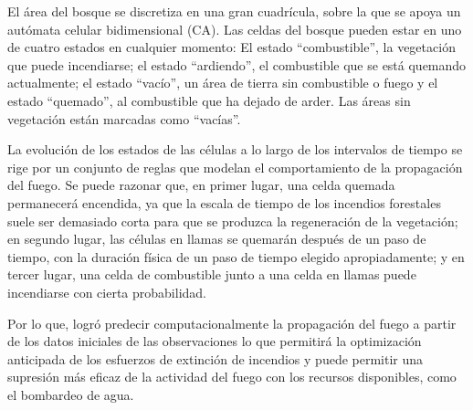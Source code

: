 \documentclass[10pt,conference]{IEEEtran}
\begin{document}
El área del bosque se discretiza en una gran cuadrícula, sobre la que se apoya un autómata celular bidimensional (CA). Las celdas del bosque pueden estar en uno de cuatro estados en cualquier momento: El estado ``combustible'', la vegetación que puede incendiarse; el estado ``ardiendo'', el combustible que se está quemando actualmente; el estado ``vacío'', un área de tierra sin combustible o fuego y el estado ``quemado'', al combustible que ha dejado de arder. Las áreas sin vegetación están marcadas como ``vacías''.\par La evolución de los estados de las células a lo largo de los intervalos de tiempo se rige por un conjunto de reglas que modelan el comportamiento de la propagación del fuego. Se puede razonar que, en primer lugar, una celda quemada permanecerá encendida, ya que la escala de tiempo de los incendios forestales suele ser demasiado corta para que se produzca la regeneración de la vegetación; en segundo lugar, las células en llamas se quemarán después de un paso de tiempo, con la duración física de un paso de tiempo elegido apropiadamente; y en tercer lugar, una celda de combustible junto a una celda en llamas puede incendiarse con cierta probabilidad.

Por lo que,  logró
predecir computacionalmente la propagación del fuego a partir de los datos iniciales de las observaciones lo que permitirá la optimización anticipada de los esfuerzos de extinción de incendios y puede permitir una supresión más eficaz de la actividad del fuego con los recursos disponibles, como el bombardeo de agua.

\vspace{2.5mm}
\end{document}
